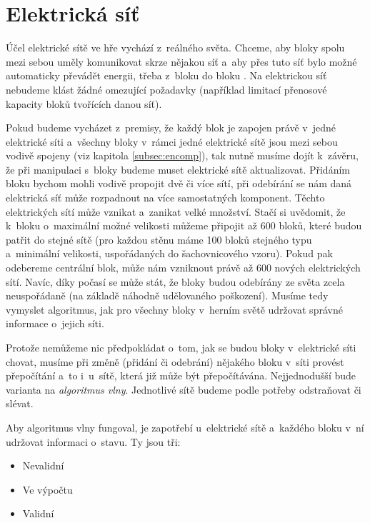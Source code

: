 

\section{Elektrická síť}
\label{sec:energyNet}
Účel elektrické sítě ve hře vychází z~reálného světa. Chceme, aby bloky spolu mezi sebou uměly komunikovat skrze nějakou síť a~aby přes tuto síť bylo možné automaticky převádět energii, třeba z~bloku  do bloku . Na elektrickou síť nebudeme klást žádné omezující požadavky (například limitací přenosové kapacity bloků tvořících danou síť).

Pokud budeme vycházet z~premisy, že každý blok je zapojen právě v~jedné elektrické síti a~všechny bloky v~rámci jedné elektrické sítě jsou mezi sebou vodivě spojeny (viz kapitola \ref{subsec:encomp}), tak nutně musíme dojít k~závěru, že při manipulaci s~bloky budeme muset elektrické sítě aktualizovat. Přidáním bloku bychom mohli vodivě propojit dvě či více sítí, při odebírání se nám daná elektrická síť může rozpadnout na více samostatných komponent. Těchto elektrických sítí může vznikat a~zanikat velké množství. Stačí si uvědomit, že k~bloku  o~maximální možné velikosti můžeme připojit až 600 bloků, které budou patřit do stejné sítě (pro každou stěnu máme 100 bloků stejného typu a~minimální velikosti, uspořádaných do šachovnicového vzoru). Pokud pak odebereme centrální blok, může nám vzniknout právě až 600 nových elektrických sítí. Navíc, díky počasí se může stát, že bloky budou odebírány ze světa zcela neuspořádaně (na základě náhodně udělovaného poškození). Musíme tedy vymyslet algoritmus, jak pro všechny bloky v~herním světě udržovat správné informace o~jejich síti.

Protože nemůžeme nic předpokládat o~tom, jak se budou bloky v~elektrické síti chovat, musíme při změně (přidání či odebrání) nějakého bloku v~síti provést přepočítání a~to i~u~sítě, která již může být přepočítávána. Nejjednodušší bude varianta na \textit{algoritmus vlny}. Jednotlivé sítě budeme podle potřeby odstraňovat či slévat. 

\pagebreak
Aby algoritmus vlny fungoval, je zapotřebí u~elektrické sítě a~každého bloku v~ní udržovat informaci o~stavu. Ty jsou tři:
\begin{itemize}
	\item Nevalidní
	\item Ve výpočtu
	\item Validní
\end{itemize}

